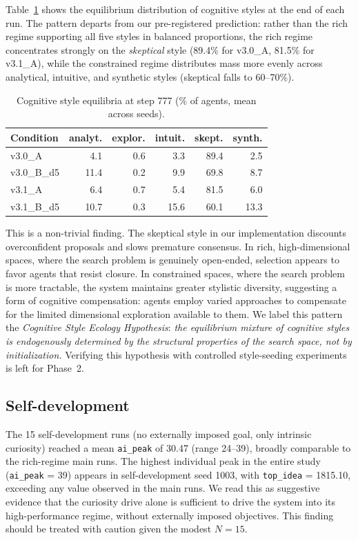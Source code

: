 \documentclass[11pt,a4paper]{article}
\begin{document}
Table~\ref{tab:styles} shows the equilibrium distribution of cognitive
styles at the end of each run. The pattern departs from our pre-registered
prediction: rather than the rich regime supporting all five styles in
balanced proportions, the rich regime concentrates strongly on the
\emph{skeptical} style (89.4\% for v3.0\_A, 81.5\% for v3.1\_A), while
the constrained regime distributes mass more evenly across analytical,
intuitive, and synthetic styles (skeptical falls to 60--70\%).

\begin{table}[h]
\centering
\caption{Cognitive style equilibria at step 777 (\% of agents, mean across seeds).}
\label{tab:styles}
\small
\begin{tabular}{lrrrrr}
\toprule
Condition & analyt. & explor. & intuit. & skept. & synth. \\
\midrule
v3.0\_A     &  4.1 & 0.6 &  3.3 & 89.4 & 2.5 \\
v3.0\_B\_d5 & 11.4 & 0.2 &  9.9 & 69.8 & 8.7 \\
v3.1\_A     &  6.4 & 0.7 &  5.4 & 81.5 & 6.0 \\
v3.1\_B\_d5 & 10.7 & 0.3 & 15.6 & 60.1 & 13.3 \\
\bottomrule
\end{tabular}
\end{table}

This is a non-trivial finding. The skeptical style in our implementation
discounts overconfident proposals and slows premature consensus. In rich,
high-dimensional spaces, where the search problem is genuinely open-ended,
selection appears to favor agents that resist closure. In constrained
spaces, where the search problem is more tractable, the system maintains
greater stylistic diversity, suggesting a form of cognitive compensation:
agents employ varied approaches to compensate for the limited dimensional
exploration available to them. We label this pattern the
\emph{Cognitive Style Ecology Hypothesis}: \emph{the equilibrium mixture
of cognitive styles is endogenously determined by the structural
properties of the search space, not by initialization.} Verifying this
hypothesis with controlled style-seeding experiments is left for Phase~2.

\subsection{Self-development}

The 15 self-development runs (no externally imposed goal, only intrinsic
curiosity) reached a mean \texttt{ai\_peak} of 30.47 (range 24--39),
broadly comparable to the rich-regime main runs. The highest individual
peak in the entire study (\texttt{ai\_peak} = 39) appears in self-development
seed 1003, with \texttt{top\_idea} = 1815.10, exceeding any value observed
in the main runs. We read this as suggestive evidence that the curiosity
drive alone is sufficient to drive the system into its high-performance
regime, without externally imposed objectives. This finding should be
treated with caution given the modest $N=15$.
\end{document}
